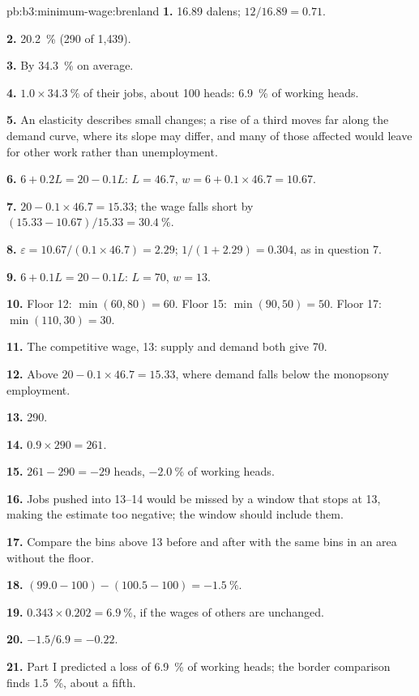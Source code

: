 \begin{solution}{pb:b3:minimum-wage:brenland}
\textbf{1.} 16.89 dalens; $12/16.89 = 0.71$.

\textbf{2.} 20.2~\% (290 of 1{,}439).

\textbf{3.} By 34.3~\% on average.

\textbf{4.} $1.0 \times 34.3~\%$ of their jobs, about 100 heads: 6.9~\% of working heads.

\textbf{5.} An elasticity describes small changes; a rise of a third moves far along the
demand curve, where its slope may differ, and many of those affected would leave
for other work rather than unemployment.

\textbf{6.} $6 + 0.2L = 20 - 0.1L$: $L = 46.7$, $w = 6 + 0.1 \times 46.7 = 10.67$.

\textbf{7.} $20 - 0.1 \times 46.7 = 15.33$; the wage falls short by $(15.33 - 10.67)/15.33 = 30.4~\%$.

\textbf{8.} $\varepsilon = 10.67/(0.1 \times 46.7) = 2.29$; $1/(1 + 2.29) = 0.304$, as in question 7.

\textbf{9.} $6 + 0.1L = 20 - 0.1L$: $L = 70$, $w = 13$.

\textbf{10.} Floor 12: $\min(60, 80) = 60$. Floor 15: $\min(90, 50) = 50$. Floor 17: $\min(110, 30) = 30$.

\textbf{11.} The competitive wage, 13: supply and demand both give 70.

\textbf{12.} Above $20 - 0.1 \times 46.7 = 15.33$, where demand falls below the monopsony employment.

\textbf{13.} 290.

\textbf{14.} $0.9 \times 290 = 261$.

\textbf{15.} $261 - 290 = -29$ heads, $-2.0~\%$ of working heads.

\textbf{16.} Jobs pushed into 13--14 would be missed by a window that stops at 13, making
the estimate too negative; the window should include them.

\textbf{17.} Compare the bins above 13 before and after with the same bins in an area
without the floor.

\textbf{18.} $(99.0 - 100) - (100.5 - 100) = -1.5~\%$.

\textbf{19.} $0.343 \times 0.202 = 6.9~\%$, if the wages of others are unchanged.

\textbf{20.} $-1.5/6.9 = -0.22$.

\textbf{21.} Part I predicted a loss of 6.9~\% of working heads; the border comparison finds
1.5~\%, about a fifth.


\end{solution}
